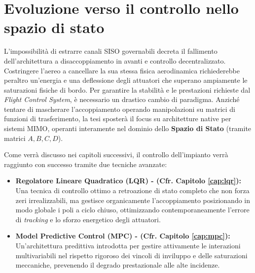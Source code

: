 \section{Evoluzione verso il controllo nello spazio di stato}
L'impossibilità di estrarre canali SISO governabili decreta il fallimento dell'architettura a disaccoppiamento in avanti e controllo decentralizzato. Costringere l'aereo a cancellare la sua stessa fisica aerodinamica richiederebbe peraltro un'energia e una deflessione degli attuatori che superano ampiamente le saturazioni fisiche di bordo. Per garantire la stabilità e le prestazioni richieste dal \textit{Flight Control System}, è necessario un drastico cambio di paradigma. Anziché tentare di mascherare l'accoppiamento operando manipolazioni su matrici di funzioni di trasferimento, la tesi sposterà il focus su architetture native per sistemi MIMO, operanti interamente nel dominio dello \textbf{Spazio di Stato} (tramite matrici $A, B, C, D$).

Come verrà discusso nei capitoli successivi, il controllo dell'impianto verrà raggiunto con successo tramite due tecniche avanzate:
\begin{itemize}
	\item \textbf{Regolatore Lineare Quadratico (LQR) - (Cfr. Capitolo \ref{cap:lqr}):} Una tecnica di controllo ottimo a retroazione di stato completo che non forza zeri irrealizzabili, ma gestisce organicamente l'accoppiamento posizionando in modo globale i poli a ciclo chiuso, ottimizzando contemporaneamente l'errore di \textit{tracking} e lo sforzo energetico degli attuatori.
	\item \textbf{Model Predictive Control (MPC) - (Cfr. Capitolo \ref{cap:mpc}):} Un'architettura predittiva introdotta per gestire attivamente le interazioni multivariabili nel rispetto rigoroso dei vincoli di inviluppo e delle saturazioni meccaniche, prevenendo il degrado prestazionale alle alte incidenze.
\end{itemize}

